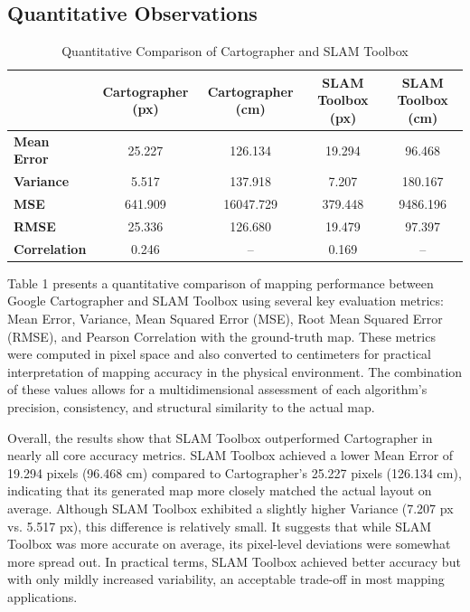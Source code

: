 \documentclass[runningheads,11pt]{llncs_bigfont_absbib}
\begin{document}
\subsection{Quantitative Observations}
\begin{table}[h!]
\centering
\caption{Quantitative Comparison of Cartographer and SLAM Toolbox}
\begin{tabular}{lcccc}
\hline
\textbf{} & \textbf{Cartographer (px)} & \textbf{Cartographer (cm)} & \textbf{SLAM Toolbox (px)} & \textbf{SLAM Toolbox (cm)} \\
\hline
\textbf{Mean Error}      & 25.227 & 126.134 & 19.294 & 96.468 \\
\textbf{Variance}        & 5.517  & 137.918 & 7.207  & 180.167 \\
\textbf{MSE}             & 641.909 & 16047.729 & 379.448 & 9486.196 \\
\textbf{RMSE}            & 25.336 & 126.680 & 19.479 & 97.397 \\
\textbf{Correlation}     & 0.246 & -- & 0.169 & -- \\
\hline
\end{tabular}
\label{tab:slam_comparison}
\end{table}

Table 1 presents a quantitative comparison of mapping performance between Google Cartographer and SLAM Toolbox using several key evaluation metrics: Mean Error, Variance, Mean Squared Error (MSE), Root Mean Squared Error (RMSE), and Pearson Correlation with the ground-truth map. These metrics were computed in pixel space and also converted to centimeters for practical interpretation of mapping accuracy in the physical environment. The combination of these values allows for a multidimensional assessment of each algorithm’s precision, consistency, and structural similarity to the actual map.

Overall, the results show that SLAM Toolbox outperformed Cartographer in nearly all core accuracy metrics. SLAM Toolbox achieved a lower Mean Error of 19.294 pixels (96.468 cm) compared to Cartographer’s 25.227 pixels (126.134 cm), indicating that its generated map more closely matched the actual layout on average. Although SLAM Toolbox exhibited a slightly higher Variance (7.207 px vs. 5.517 px), this difference is relatively small. It suggests that while SLAM Toolbox was more accurate on average, its pixel-level deviations were somewhat more spread out. In practical terms, SLAM Toolbox achieved better accuracy but with only mildly increased variability, an acceptable trade-off in most mapping applications.
\end{document}
